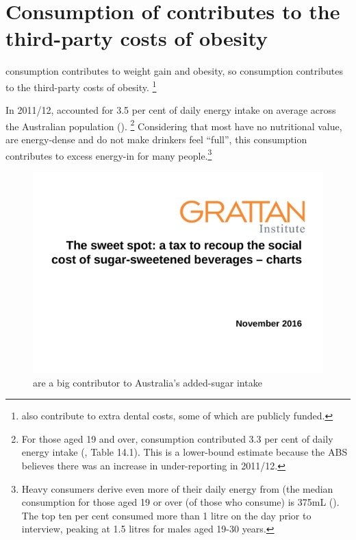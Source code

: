 \documentclass[embargoed]{grattan}
\begin{document}
\section{Consumption of \SSBs{} contributes to the third-party costs of obesity}\label{sec:consumption-of-ssbs-contributes-to-the-third-party-costs-of-obesity}

\SSB{} consumption contributes to weight gain and obesity, so \SSB{} consumption contributes to the third-party costs of obesity.%
\footnote{\SSBs{} also contribute to extra dental costs, some of which are publicly funded.}

In 2011/12, \SSBs{} accounted for 3.5 per cent of daily energy intake on average across the Australian population ().%
\footnote{For those aged 19 and over, \SSB{} consumption contributed 3.3 per cent of daily energy intake (\textcite{ABS20144364055007AustralianHealth}, Table 14.1).
This is a lower-bound estimate because the ABS believes there was an increase in under-reporting in 2011/12.} Considering that most \SSBs{} have no nutritional value, are energy-dense and do not make drinkers feel ``full'', this consumption contributes to excess energy-in for many people.\footnote{Heavy consumers derive even more of their daily energy from \SSBs{} (the median \SSB{} consumption for those aged 19 or over (of those who consume) is 375mL (\textcite[][Table 18]{ABS2013436405503AustralianHealth}).
The top ten per cent consumed more than 1 litre on the day prior to interview, peaking at 1.5 litres for males aged 19-30 years.}

\begin{figure}
\caption{\SSBs{} are a big contributor to Australia's added-sugar intake} \label{fig:SSBs-are-a-big-contributor-to-Austs-added-sugar-intake}

\includegraphics[page=10]{atlas/ObesityCharts}

\end{figure}
\end{document}

